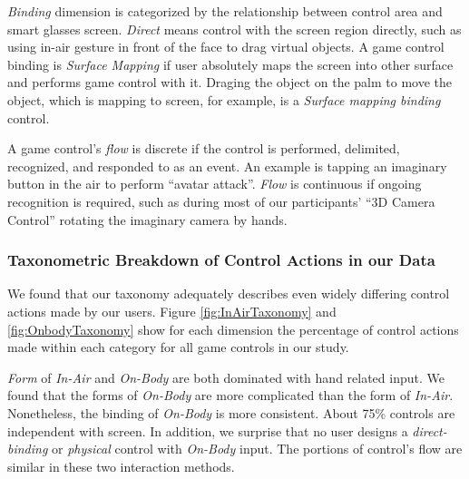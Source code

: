 \documentclass{sigchi}
\begin{document}
  \emph{Binding} dimension is categorized by the relationship between control area and smart glasses screen. \emph{Direct} means control with the screen region directly, such as using in-air gesture in front of the face to drag virtual objects. A game control binding is \emph{Surface Mapping} if user absolutely maps the screen into other surface and performs game control with it. Draging the object on the palm to move the object, which is mapping to screen, for example, is a \emph{Surface mapping binding} control. 

  A game control's \emph{flow} is discrete if the control is performed, delimited, recognized, and responded to as an event. An example is tapping an imaginary button in the air to perform ``avatar attack''. \emph{Flow} is continuous if ongoing recognition is required, such as during most of our participants' ``3D Camera Control'' rotating the imaginary camera by hands. 
 

 \subsubsection{Taxonometric Breakdown of Control Actions in our Data}
We found that our taxonomy adequately describes even widely differing control actions made by our users. Figure \ref{fig:InAirTaxonomy} and \ref{fig:OnbodyTaxonomy} show for each dimension the percentage of control actions made within each category for all game controls in our study.


\emph{Form} of \emph{In-Air} and \emph{On-Body} are both dominated with hand related input. We found that the forms of \emph{On-Body} are more complicated than the form of \emph{In-Air}. Nonetheless, the binding of \emph{On-Body} is more consistent. About 75\% controls are independent with screen. In addition, we surprise that no user designs a \emph{direct-binding} or \emph{physical} control with \emph{On-Body} input. The portions of control's flow are similar in these two interaction methods.
\end{document}
